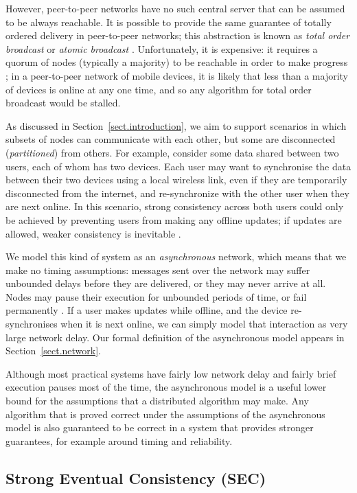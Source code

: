 However, peer-to-peer networks have no such central server that can be assumed to be always
reachable. It is possible to provide the same guarantee of totally ordered delivery in peer-to-peer
networks; this abstraction is known as \emph{total order broadcast} or \emph{atomic broadcast}
\cite{Cachin:2011wt}. Unfortunately, it is expensive: it requires a quorum of nodes (typically a
majority) to be reachable in order to make progress \cite{Chandra:1996cp}; in a peer-to-peer network
of mobile devices, it is likely that less than a majority of devices is online at any one time, and
so any algorithm for total order broadcast would be stalled.

As discussed in Section~\ref{sect.introduction}, we aim to support scenarios in which subsets of
nodes can communicate with each other, but some are disconnected (\emph{partitioned}) from others.
For example, consider some data shared between two users, each of whom has two devices. Each user
may want to synchronise the data between their two devices using a local wireless link, even if they
are temporarily disconnected from the internet, and re-synchronize with the other user when they are
next online. In this scenario, strong consistency across both users could only be achieved by
preventing users from making any offline updates; if updates are allowed, weaker consistency is
inevitable \cite{Attiya:2015dm,Davidson:1985hv}.

We model this kind of system as an \emph{asynchronous} network, which means that we make no timing
assumptions: messages sent over the network may suffer unbounded delays before they are delivered,
or they may never arrive at all. Nodes may pause their execution for unbounded periods of time, or
fail permanently \cite{Cachin:2011wt}. If a user makes updates while offline, and the device
re-synchronises when it is next online, we can simply model that interaction as very large network
delay. Our formal definition of the asynchronous model appears in Section~\ref{sect.network}.

Although most practical systems have fairly low network delay and fairly brief execution pauses most
of the time, the asynchronous model is a useful lower bound for the assumptions that a distributed
algorithm may make. Any algorithm that is proved correct under the assumptions of the asynchronous
model is also guaranteed to be correct in a system that provides stronger guarantees, for example
around timing and reliability.

\subsection{Strong Eventual Consistency (SEC)}\label{sect.eventual.consistency}

